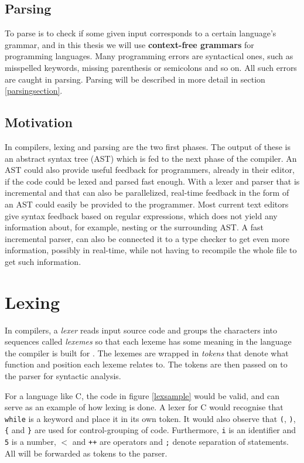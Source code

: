 \documentclass[a4paper,12pt,twosided]{report}
\renewcommand\cite{\citep}
\begin{document}
\subsection{Parsing}
To parse is to check if some given input corresponds to a certain language's
grammar, and in this thesis we will use \textbf{context-free grammars} for
programming languages. Many programming errors are syntactical ones, such as
misspelled keywords, missing parenthesis or semicolons and so on. All such
errors are caught in parsing. Parsing will be described in more detail in
section \ref{parsingsection}.

\subsection{Motivation}
In compilers, lexing and parsing are the two first phases. The output of these
is an abstract syntax tree (AST) which is fed to the next phase of the compiler.
An AST could also provide useful feedback for programmers, already in their
editor, if the code could be lexed and parsed fast enough. With a lexer and
parser that is incremental and that can also be parallelized, real-time feedback
in the form of an AST could easily be provided to the programmer. Most current
text editors give syntax feedback based on regular expressions, which does not
yield any information about, for example, nesting or the surrounding AST. A
fast incremental parser, can also be connected it to a type checker to get even
more information, possibly in real-time, while not having to recompile the whole
file to get such information.

\section{Lexing}
In compilers, a \textit{lexer} reads input source code and groups the characters
into sequences called \textit{lexemes} so that each lexeme has some meaning in
the language the compiler is built for \cite[p. 5, p. 109]{dragonbook}. The
lexemes are wrapped in \textit{tokens} that denote what function and position
each lexeme relates to. The tokens are then passed on to the parser for
syntactic analysis.

For a language like C, the code in figure \ref{lexsample} would be valid, and
can serve as an example of how lexing is done.  A lexer for C would recognise
that \texttt{while} is a keyword and place it in its own token. It would also
observe that \texttt{(}, \texttt{)}, \texttt{\{} and \texttt{\}} are used for
control-grouping of code. Furthermore, \texttt{i} is an identifier and
\texttt{5} is a number, \texttt{$<$} and \texttt{++} are operators and
\texttt{;} denote separation of statements. All will be forwarded as tokens to
the parser.
\end{document}
